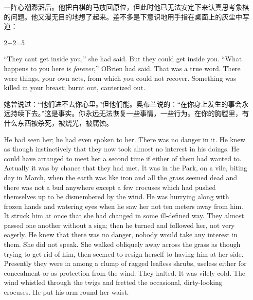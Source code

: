 \begin{paracol}{2}
\switchcolumn

一阵心潮澎湃后。他把白棋的马放回原位，但此时他已无法安定下来认真思考象棋的问题。他又漫无目的地想了起来。差不多是下意识地用手指在桌面上的灰尘中写道：

\switchcolumn*


\switchcolumn

2+2=5

\switchcolumn*

``They can\textquotesingle t get inside you,'' she had said. But they
could get inside you. ``What happens to you here is \emph{forever},''
O\textquotesingle Brien had said. That was a true word. There were
things, your own acts, from which you could not recover. Something was
killed in your breast; burnt out, cauterized out.

\switchcolumn

她曾说过：``他们进不去你心里。''但他们能。奥布兰说的：``在你身上发生的事会永远持续下去。''这是事实。你永远无法恢复一些事情，一些行为。在你的胸膛里，有什么东西被杀死，被烧光，被腐蚀。

\switchcolumn*

He had seen her; he had even spoken to her. There was no danger in it.
He knew as though instinctively that they now took almost no interest in
his doings. He could have arranged to meet her a second time if either
of them had wanted to. Actually it was by chance that they had met. It
was in the Park, on a vile, biting day in March, when the earth was like
iron and all the grass seemed dead and there was not a bud anywhere
except a few crocuses which had pushed themselves up to be dismembered
by the wind. He was hurrying along with frozen hands and watering eyes
when he saw her not ten meters away from him. It struck him at once that
she had changed in some ill-defined way. They almost passed one another
without a sign; then he turned and followed her, not very eagerly. He
knew that there was no danger, nobody would take any interest in them.
She did not speak. She walked obliquely away across the grass as though
trying to get rid of him, then seemed to resign herself to having him at
her side. Presently they were in among a clump of ragged leafless
shrubs, useless either for concealment or as protection from the wind.
They halted. It was vilely cold. The wind whistled through the twigs and
fretted the occasional, dirty-looking crocuses. He put his arm round her
waist.

\switchcolumn


\end{paracol}
